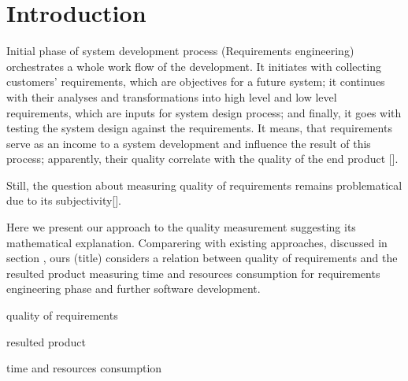 \section{Introduction}
\label{sec:Intro} 
Initial phase of system development process (Requirements engineering) orchestrates a whole work flow of the development. It initiates with collecting customers' requirements, which are objectives for a future system; it continues with their  analyses and transformations into high level and low level requirements, which are inputs for system design process; and finally, it goes with testing the system design against the requirements. It means, that requirements serve as an income to a system development and influence the result of this process; apparently, their quality correlate with the quality of the end product [].

Still, the question about measuring quality of requirements remains problematical due to its subjectivity[].

 Here we present our approach to the quality measurement suggesting its mathematical explanation. Comparering with existing approaches, discussed in section , ours (title) considers a relation between quality of requirements and the resulted product measuring time and resources consumption for requirements engineering phase and further software development.

quality of requirements

resulted product

time and resources consumption 